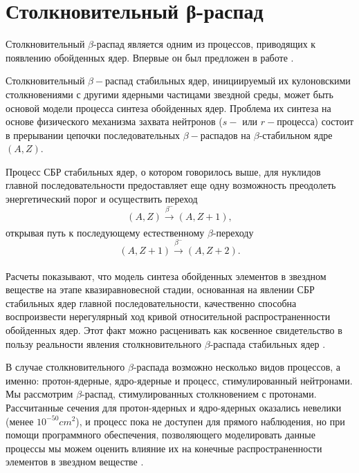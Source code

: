 \documentclass[14pt, a4paper]{article}
\begin{document}

\section{Столкновительный β-распад}
Столкновительный $\beta$-распад является одним из процессов, приводящих к появлению обойденных ядер. Впервые он был предложен в работе \cite{batkin}.

Столкновительный $\beta-$распад стабильных ядер, инициируемый их кулоновскими столкновениями с другими ядерными частицами звездной среды, может быть основой модели процесса синтеза обойденных ядер.
Проблема их синтеза на основе физического механизма захвата нейтронов ($s-$ или $r-$процесса) состоит в прерывании цепочки последовательных $\beta-$распадов на $\beta$-стабильном ядре $(A,Z)$.

Процесс СБР стабильных ядер, о котором говорилось выше, для нуклидов главной последовательности предоставляет еще одну возможность преодолеть энергетический порог и осуществить переход
$$(A,Z) \xrightarrow[]{\beta^-} (A,Z + 1),$$
открывая путь к последующему естественному $\beta$-переходу
$$(A,Z+1) \xrightarrow[]{\beta^-} (A,Z + 2).$$

Расчеты показывают, что модель синтеза обойденных элементов в звездном веществе на этапе квазиравновесной стадии, основанная на явлении СБР стабильных ядер главной последовательности, качественно способна воспроизвести нерегулярный ход кривой относительной распространенности обойденных ядер. Этот факт можно расценивать как косвенное свидетельство в пользу реальности явления столкновительного $\beta$-распада стабильных ядер \cite{tak}.

В случае столкновительного $\beta$-распада возможно несколько видов процессов, а именно: протон-ядерные, ядро-ядерные и процесс, стимулированный нейтронами. Мы рассмотрим $\beta$-распад, стимулированных столкновением с протонами. Рассчитанные сечения для протон-ядерных и ядро-ядерных оказались невелики (менее $10^{-50}cm^2$), и процесс пока не доступен для прямого наблюдения, но при помощи программного обеспечения, позволяющего моделировать данные процессы мы можем оценить влияние их на конечные распространенности элементов в звездном веществе \cite{tak_article}.
\end{document}
